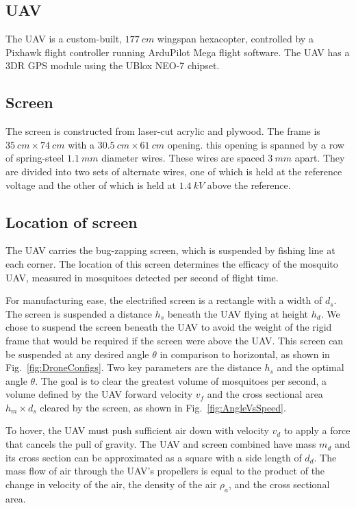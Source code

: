 \documentclass[letterpaper, 10 pt, conference]{ieeeconf}  %
\begin{document}
  \subsection{UAV}
  
The UAV is a custom-built, $177~cm$ wingspan hexacopter, controlled by a Pixhawk flight controller running ArduPilot Mega flight software. The UAV has a 3DR GPS module using the UBlox NEO-7 chipset.

  \subsection{Screen}
  
  The screen is constructed from laser-cut acrylic and plywood.  The frame is $35~cm \times 74~cm$ with a   $30.5~cm \times 61~cm$  opening.  
  this opening is spanned by a row of spring-steel $1.1~mm$ diameter wires.  These wires are spaced $3~mm$ apart.  They are divided into two sets of alternate wires, one of which is held at the reference voltage and the other of which is held at $1.4~kV$ above the reference.


  \subsection{Location of screen}
 The UAV carries the bug-zapping screen, which is suspended by fishing line at each corner.  The location of this screen determines the efficacy of the mosquito UAV, measured in mosquitoes detected per second of flight time.

For manufacturing ease, the electrified screen is a rectangle with a width of $d_s$. The screen is suspended a distance $h_s$ beneath the UAV flying at height $h_d$.  We chose to suspend the screen beneath the UAV to avoid the weight of the rigid frame that would be required if the screen were above the UAV.  This screen can be suspended at any desired angle $\theta$ in comparison to horizontal, as shown in Fig.~\ref{fig:DroneConfigs}.
Two key parameters are the distance $h_s$ and the optimal angle $\theta$.  The goal is to clear the greatest volume of mosquitoes per second, a volume defined by the UAV forward velocity $v_f$ and the cross sectional area $h_m \times d_s$ cleared by the screen, as shown in Fig.~\ref{fig:AngleVsSpeed}.

 To hover, the UAV must push sufficient air down with velocity $v_d$ to apply a force that cancels the pull of gravity.  The UAV and screen combined have mass $m_{d}$ and its cross section can be approximated as a square with a side length of $d_d$.  The mass flow of air through the UAV's propellers is equal to the product of the change in velocity of the air, the density of the air $\rho_a$, and the cross sectional area.
 
\end{document}
